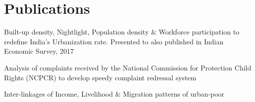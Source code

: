 \documentclass[]{deedy-resume-openfont}
\begin{document}
\begin{minipage}[t]{0.66\textwidth}

\section{Publications}
Built-up density, Nightlight, Population density \& Workforce participation to redefine India's Urbanization rate. Presented to  also published in Indian Economic Survey, 2017
\sectionsep

Analysis of complaints received by the National Commission for Protection Child Rights (NCPCR) to develop speedy complaint redressal system
\sectionsep

Inter-linkages of Income, Livelihood \& Migration patterns of urban-poor
\sectionsep







\end{minipage}
\end{document}
